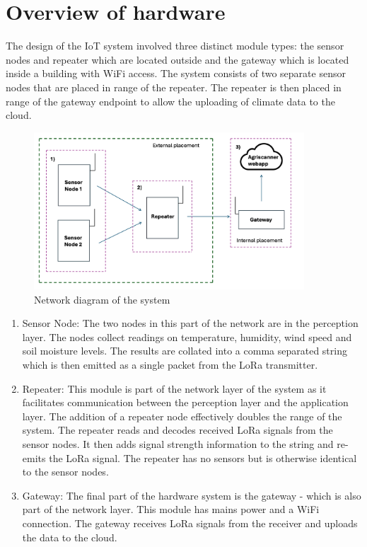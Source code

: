 \section{Overview of hardware}\label{sec:hardware-overview}

The design of the IoT system involved three distinct module types: the sensor
nodes and repeater which are located outside and the gateway which is located
inside a building with WiFi access. The system consists of two separate sensor
nodes that are placed in range of the repeater. The repeater is then placed in
range of the gateway endpoint to allow the uploading of climate data to the
cloud.

\begin{figure}[H]
      \centering
      \includegraphics[width=0.9\textwidth]{contents/part-2/fig2/network-diagram.png}
      \caption{Network diagram of the system}
      \label{fig:network-diagram}
\end{figure} 

\begin{enumerate}
      \item Sensor Node: The two nodes in this part of the network are in the
            perception layer. The nodes collect readings on temperature, humidity,
            wind speed and soil moisture levels. The results are collated into a
            comma separated string which is then emitted as a single packet from
            the LoRa transmitter.
      \item Repeater: This module is part of the network layer of the system as it
            facilitates communication between the perception layer and the
            application layer. The addition of a repeater node effectively doubles
            the range of the system. The repeater reads and decodes received
            LoRa signals from the sensor nodes. It then adds signal strength
            information to the string and re-emits the LoRa signal. The repeater
            has no sensors but is otherwise identical to the sensor nodes.
      \item Gateway: The final part of the hardware system is the gateway - which
            is also part of the network layer. This module has mains power and a
            WiFi connection. The gateway receives LoRa signals from the receiver
            and uploads the data to the cloud.
\end{enumerate}



